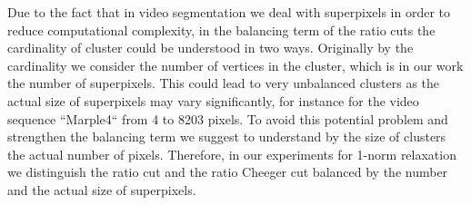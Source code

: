 Due to the fact that in video segmentation we deal with superpixels in order to reduce computational complexity, in the balancing term of the ratio cuts the cardinality of cluster could be understood in two ways.
Originally by the cardinality we consider the number of vertices in the cluster, which is in our work the number of superpixels. This could lead to very unbalanced clusters as the actual size of
superpixels may vary significantly, for instance for the video sequence ``Marple4`` from 4 to 8203 pixels. To avoid this potential problem and strengthen the balancing term we suggest to understand by the size of clusters 
the actual number of pixels.
Therefore, in our experiments for 1-norm relaxation we distinguish the ratio cut and the ratio Cheeger cut balanced by the number and the actual size of superpixels. 
   
